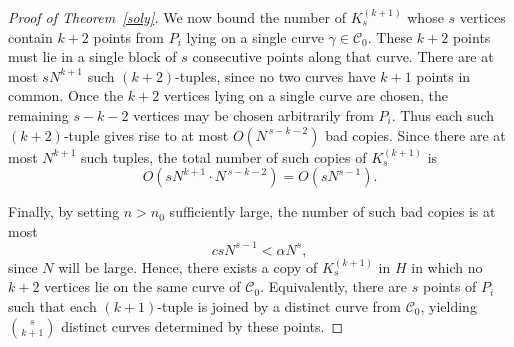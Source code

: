 \documentclass[10pt,a4paper]{amsart}
\begin{document}
\begin{proof}[Proof of Theorem~\ref{soly}]
We now bound the number of $K^{(k+1)}_s$ whose $s$ vertices contain $k + 2$ points from $P_i$ lying on a single curve $\gamma\in\mathcal C_0$. These $k + 2$ points must lie in a single block of $s$ consecutive points along that curve.  There are at most $sN^{k + 1}$ such $(k +2)$-tuples, since no two curves have $k + 1$ points in common. Once the \(k+2\) vertices lying on a single curve are chosen, the remaining \(s-k-2\) vertices may be chosen arbitrarily from \(P_i\). Thus each such $(k+2)$-tuple gives rise to at most \(O(N^{\,s-k-2})\) bad copies. Since there are at most \(N^{k+1}\) such tuples, the total number of such copies of $K_s^{(k + 1)}$ is
\[
O\!\left(sN^{k+1}\cdot N^{\,s-k-2}\right)=O(sN^{s-1}).
\]

 Finally, by setting $n > n_0$ sufficiently large, the number of such bad copies is at most
\[
csN^{s-1} < \alpha N^s,
\]
since \(N\) will be large. Hence, there exists a copy of \(K^{(k + 1)}_s\) in $H$ in which no $k + 2$ vertices lie on the same curve of \(\mathcal C_0\). Equivalently, there are \(s\) points of \(P_i\) such that each $(k + 1)$-tuple  is joined by a distinct curve from \(\mathcal C_0\), yielding \(\binom{s}{k + 1}\) distinct curves determined by these points.
\end{proof}
\end{document}
